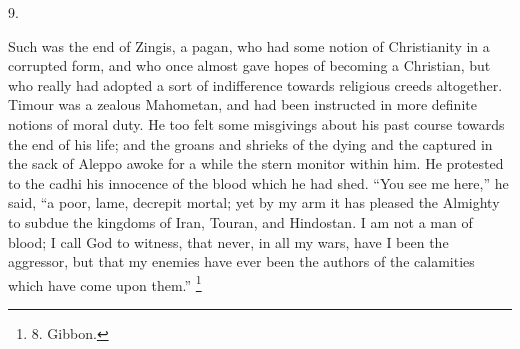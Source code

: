 9.

Such was the end of Zingis, a
pagan, who had some notion of Christianity in a corrupted form, and
who once almost gave hopes of becoming a Christian, but who really had
adopted a sort of indifference towards religious creeds altogether.
Timour was a zealous Mahometan, and had been instructed in more
definite notions of moral duty. He too felt some misgivings about his
past course towards the end of his life; and the groans and shrieks of
the dying and the captured in the sack of Aleppo awoke for a while the
stern monitor within him. He protested to the cadhi his innocence of
the blood which he had shed. ``You see me here,'' he said, ``a poor,
lame, decrepit mortal; yet by my arm it has pleased the Almighty to
subdue the kingdoms of Iran, Touran, and Hindostan. I am not a man of
blood; I call God to witness, that never, in all my wars, have I been
the aggressor, but that my enemies have ever been the authors of the
calamities which have come upon them.'' \footnote{8.
Gibbon.}

